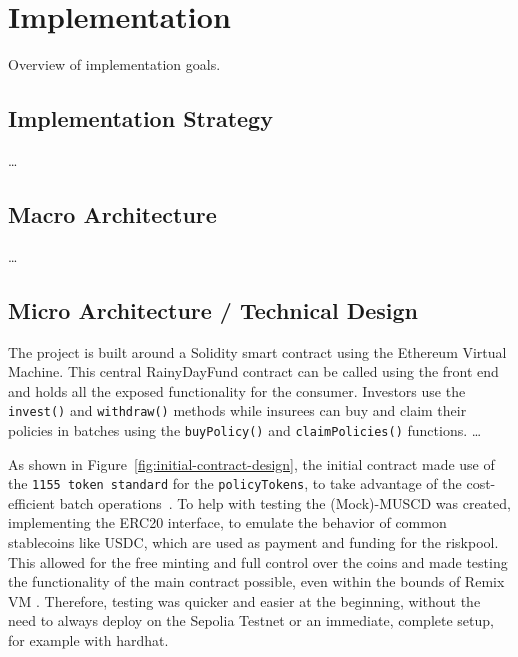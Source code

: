 \documentclass[11pt,a4paper]{article}
\begin{document}
    \section{Implementation}\label{sec:implementation}
    Overview of implementation goals.

    \subsection{Implementation Strategy}\label{subsec:implementation-strategy}
    \ldots

    \subsection{Macro Architecture}\label{subsec:macro-architecture}
    \ldots

    \subsection{Micro Architecture / Technical Design}\label{subsec:micro-architecture}
    The project is built around a Solidity smart contract using the Ethereum Virtual Machine.
    This central RainyDayFund contract can be called using the front end and holds all the exposed functionality for the consumer.
    Investors use the \texttt{invest()} and \texttt{withdraw()} methods while insurees can buy and claim their policies in batches using the \texttt{buyPolicy()} and \texttt{claimPolicies()} functions. \ldots

    As shown in Figure~\ref{fig:initial-contract-design}, the initial contract made use of the \texttt{1155 token standard} for the \texttt{policyTokens}, to take advantage of the cost-efficient batch operations~\parencite{ERC1155}.
    To help with testing the (Mock)-MUSCD was created, implementing the ERC20 interface, to emulate the behavior of common stablecoins like USDC, which are used as payment and funding for the riskpool.
    This allowed for the free minting and full control over the coins and made testing the functionality of the main contract possible, even within the bounds of Remix VM .
    Therefore, testing was quicker and easier at the beginning, without the need to always deploy on the Sepolia Testnet or an immediate, complete setup, for example with hardhat.
\end{document}
